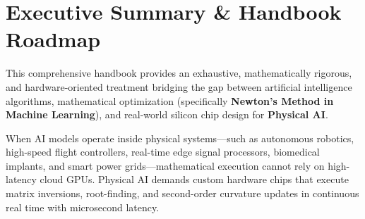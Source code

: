 \documentclass[11pt,a4paper,oneside]{book}
\begin{document}
\chapter*{Executive Summary \& Handbook Roadmap}

This comprehensive handbook provides an exhaustive, mathematically rigorous, and hardware-oriented treatment bridging the gap between artificial intelligence algorithms, mathematical optimization (specifically \textbf{Newton's Method in Machine Learning}), and real-world silicon chip design for \textbf{Physical AI}.

When AI models operate inside physical systems---such as autonomous robotics, high-speed flight controllers, real-time edge signal processors, biomedical implants, and smart power grids---mathematical execution cannot rely on high-latency cloud GPUs. Physical AI demands custom hardware chips that execute matrix inversions, root-finding, and second-order curvature updates in continuous real time with microsecond latency.
\end{document}
